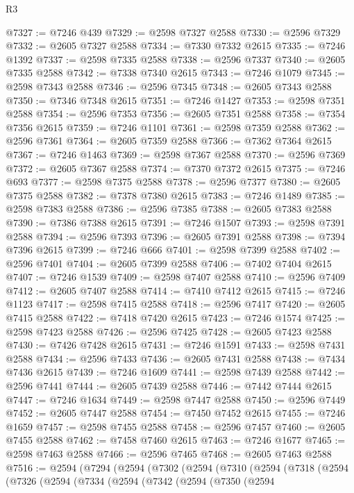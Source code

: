 \begin{lexlean}{R3}
\begin{coremodule}
@7327 := @7246 @439
@7329 := @2598 @7327 @2588
@7330 := @2596 @7329
@7332 := @2605 @7327 @2588
@7334 := @7330 @7332 @2615
@7335 := @7246 @1392
@7337 := @2598 @7335 @2588
@7338 := @2596 @7337
@7340 := @2605 @7335 @2588
@7342 := @7338 @7340 @2615
@7343 := @7246 @1079
@7345 := @2598 @7343 @2588
@7346 := @2596 @7345
@7348 := @2605 @7343 @2588
@7350 := @7346 @7348 @2615
@7351 := @7246 @1427
@7353 := @2598 @7351 @2588
@7354 := @2596 @7353
@7356 := @2605 @7351 @2588
@7358 := @7354 @7356 @2615
@7359 := @7246 @1101
@7361 := @2598 @7359 @2588
@7362 := @2596 @7361
@7364 := @2605 @7359 @2588
@7366 := @7362 @7364 @2615
@7367 := @7246 @1463
@7369 := @2598 @7367 @2588
@7370 := @2596 @7369
@7372 := @2605 @7367 @2588
@7374 := @7370 @7372 @2615
@7375 := @7246 @693
@7377 := @2598 @7375 @2588
@7378 := @2596 @7377
@7380 := @2605 @7375 @2588
@7382 := @7378 @7380 @2615
@7383 := @7246 @1489
@7385 := @2598 @7383 @2588
@7386 := @2596 @7385
@7388 := @2605 @7383 @2588
@7390 := @7386 @7388 @2615
@7391 := @7246 @1507
@7393 := @2598 @7391 @2588
@7394 := @2596 @7393
@7396 := @2605 @7391 @2588
@7398 := @7394 @7396 @2615
@7399 := @7246 @666
@7401 := @2598 @7399 @2588
@7402 := @2596 @7401
@7404 := @2605 @7399 @2588
@7406 := @7402 @7404 @2615
@7407 := @7246 @1539
@7409 := @2598 @7407 @2588
@7410 := @2596 @7409
@7412 := @2605 @7407 @2588
@7414 := @7410 @7412 @2615
@7415 := @7246 @1123
@7417 := @2598 @7415 @2588
@7418 := @2596 @7417
@7420 := @2605 @7415 @2588
@7422 := @7418 @7420 @2615
@7423 := @7246 @1574
@7425 := @2598 @7423 @2588
@7426 := @2596 @7425
@7428 := @2605 @7423 @2588
@7430 := @7426 @7428 @2615
@7431 := @7246 @1591
@7433 := @2598 @7431 @2588
@7434 := @2596 @7433
@7436 := @2605 @7431 @2588
@7438 := @7434 @7436 @2615
@7439 := @7246 @1609
@7441 := @2598 @7439 @2588
@7442 := @2596 @7441
@7444 := @2605 @7439 @2588
@7446 := @7442 @7444 @2615
@7447 := @7246 @1634
@7449 := @2598 @7447 @2588
@7450 := @2596 @7449
@7452 := @2605 @7447 @2588
@7454 := @7450 @7452 @2615
@7455 := @7246 @1659
@7457 := @2598 @7455 @2588
@7458 := @2596 @7457
@7460 := @2605 @7455 @2588
@7462 := @7458 @7460 @2615
@7463 := @7246 @1677
@7465 := @2598 @7463 @2588
@7466 := @2596 @7465
@7468 := @2605 @7463 @2588
@7516 := @2594
    (@7294
      (@2594
        (@7302
          (@2594
            (@7310
              (@2594
                (@7318
                  (@2594
                    (@7326
                      (@2594
                        (@7334
                          (@2594
                            (@7342
                              (@2594
                                (@7350
                                  (@2594

\end{coremodule}
\end{lexlean}

